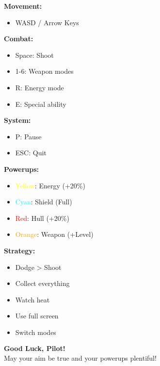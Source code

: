 \documentclass[11pt,a4paper]{article}
\begin{document}
\begin{multicols}{2}
\textbf{Movement:}
\begin{itemize}[nosep]
    \item WASD / Arrow Keys
\end{itemize}

\textbf{Combat:}
\begin{itemize}[nosep]
    \item Space: Shoot
    \item 1-6: Weapon modes
    \item R: Energy mode
    \item E: Special ability
\end{itemize}

\textbf{System:}
\begin{itemize}[nosep]
    \item P: Pause
    \item ESC: Quit
\end{itemize}

\columnbreak

\textbf{Powerups:}
\begin{itemize}[nosep]
    \item \textcolor{yellow}{Yellow}: Energy (+20\%)
    \item \textcolor{cyan}{Cyan}: Shield (Full)
    \item \textcolor{red}{Red}: Hull (+20\%)
    \item \textcolor{orange}{Orange}: Weapon (+Level)
\end{itemize}

\textbf{Strategy:}
\begin{itemize}[nosep]
    \item Dodge > Shoot
    \item Collect everything
    \item Watch heat
    \item Use full screen
    \item Switch modes
\end{itemize}
\end{multicols}


\vfill

\begin{center}
\Large
\textbf{Good Luck, Pilot!}\\
\vspace{0.5cm}
\normalsize
May your aim be true and your powerups plentiful!
\end{center}
\end{document}
